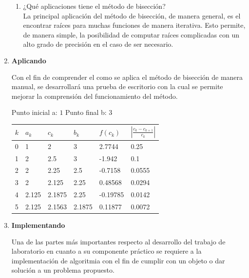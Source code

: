\documentclass[english,notitlepage,letterpaper, 10pt]{article} %
\begin{document}
\begin{enumerate}
\begin{enumerate}
      \item ¿Qué aplicaciones tiene el método de bisección? \\
      La principal aplicación del método de bisección, de manera general, es el encontrar raíces para muchas funciones de manera iterativa. Esto permite, de manera simple, la posibilidad de computar raíces complicadas con un alto grado de precisión en el caso de ser necesario.

    \end{enumerate}

    \item \textbf{Aplicando}
    
    Con el fin de comprender el como se aplica el método de bisección de manera manual, se desarrollará una prueba de escritorio con la cual se permite mejorar la comprensión del funcionamiento del método.

    \begin{table}[H]

      \centering
      Punto inicial a: $1$ Punto final b: $3$ \\
      \vspace{0.5cm}
      \begin{tabular}{|p{2.5cm}|p{2.5cm}|p{2.5cm}|p{2.5cm}|p{2.5cm}|p{2.5cm}|}

       \hline  
       $k$ & $a_k$ & $c_k$ & $b_k$ & $f(c_k)$ & $|\frac{c_k-c_{k+1}}{c_k}|$ \\ \hline
       0 & 1     & 2      & 3       & 2.7744   & 0.25   \\ \hline
       1 & 2     & 2.5    & 3       & -1.942   & 0.1    \\ \hline
       2 & 2     & 2.25   & 2.5     & -0.7158  & 0.0555 \\ \hline
       3 & 2     & 2.125  & 2.25    & 0.48568  & 0.0294 \\ \hline
       4 & 2.125 & 2.1875 & 2.25    & -0.19785 & 0.0142 \\ \hline
       5 & 2.125 & 2.1563 & 2.1875  & 0.11877  & 0.0072 \\ \hline

      \end{tabular}
    \end{table}

    \item \textbf{Implementando}
    
    Una de las partes más importantes respecto al desarrollo del trabajo de laboratorio en cuanto a su componente práctico se requiere a la implementación de algoritmia con el fin de cumplir con un objeto o dar solución a un problema propuesto.


\end{enumerate}
\end{document}

